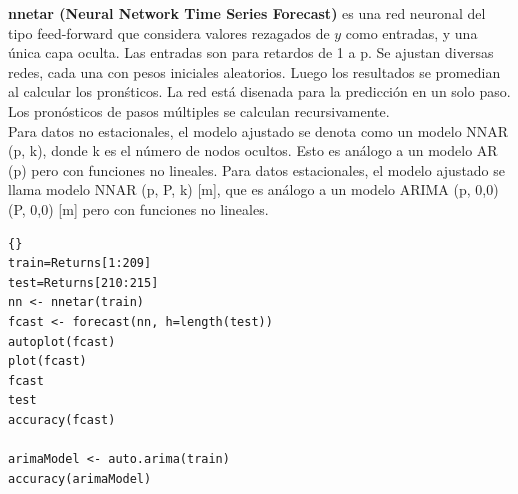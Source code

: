 
	
	\textbf{nnetar (Neural Network Time Series Forecast)} es una red neuronal del tipo feed-forward que considera valores rezagados de $y$ como entradas, y una \'unica capa oculta. Las entradas son para retardos de 1 a p. Se ajustan diversas redes, cada una con pesos iniciales aleatorios. Luego los resultados se promedian al calcular los pron\'sticos. La red está disenada para la predicci\'on en un solo paso. Los pron\'osticos de pasos m\'ultiples se calculan recursivamente. \\
	Para datos no estacionales, el modelo ajustado se denota como un modelo NNAR (p, k), donde k es el n\'umero de nodos ocultos. Esto es an\'alogo a un modelo AR (p) pero con funciones no lineales. Para datos estacionales, el modelo ajustado se llama modelo NNAR (p, P, k) [m], que es an\'alogo a un modelo ARIMA (p, 0,0) (P, 0,0) [m] pero con funciones no lineales. 
	

%	
	
%			
%			
\begin{lstlisting}[title={‘Código R: },basicstyle=\ttfamily]{}
train=Returns[1:209]
test=Returns[210:215]
nn <- nnetar(train)
fcast <- forecast(nn, h=length(test))
autoplot(fcast)
plot(fcast)
fcast
test
accuracy(fcast)

arimaModel <- auto.arima(train)
accuracy(arimaModel)
\end{lstlisting}

